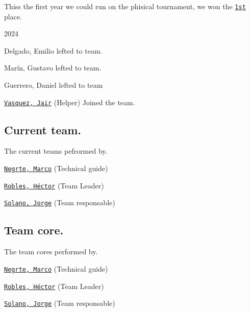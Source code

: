\begin{DoxyItemize}
\begin{DoxyItemize}
\item This\textquotesingle{}s the first year we could run on the phisical tournament, we won the \href{https://femexrobotica.org/tmr2023/resultados/}{\tt 1st} place.
\end{DoxyItemize}
\item 2024
\begin{DoxyItemize}
\item Delgado, Emilio lefted to team.
\item Marín, Gustavo lefted to team.
\item Guerrero, Daniel lefted to team
\item \href{https://github.com/JAIRVASQUEZTORRES}{\tt Vasquez, Jair} (Helper) Joined the team.
\end{DoxyItemize}
\end{DoxyItemize}

\subsection*{Current team.}

The current team\textquotesingle{}s pefrormed by.


\begin{DoxyItemize}
\item \href{https://github.com/mnegretev}{\tt Negrte, Marco} (Technical guide)
\item \href{https://github.com/Hector290601}{\tt Robles, Héctor} (Team Leader)
\item \href{https://github.com/jrg-sln}{\tt Solano, Jorge} (Team responsable)
\end{DoxyItemize}

\subsection*{Team core.}

The team core\textquotesingle{}s performed by.


\begin{DoxyItemize}
\item \href{https://github.com/mnegretev}{\tt Negrte, Marco} (Technical guide)
\item \href{https://github.com/Hector290601}{\tt Robles, Héctor} (Team Leader)
\item \href{https://github.com/jrg-sln}{\tt Solano, Jorge} (Team responsable) 
\end{DoxyItemize}